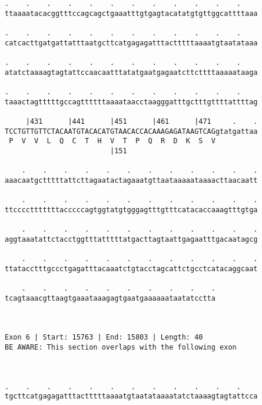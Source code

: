 \documentclass{article}
\begin{document}
\begin{Verbatim}
.    .    .    .    .    .    .    .    .    .    .    .    
ttaaaatacacggtttccagcagctgaaatttgtgagtacatatgtgttggcattttaaa
                                                            
.    .    .    .    .    .    .    .    .    .    .    .    
catcacttgatgattatttaatgcttcatgagagatttactttttaaaatgtaatataaa
                                                            
.    .    .    .    .    .    .    .    .    .    .    .    
atatctaaaagtagtattccaacaatttatatgaatgagaatcttcttttaaaaataaga
                                                            
.    .    .    .    .    .    .    .    .    .    .    .    
taaactagtttttgccagttttttaaaataacctaagggatttgctttgttttattttag
                                                            
     |431      |441      |451      |461      |471     .    .
TCCTGTTGTTCTACAATGTACACATGTAACACCACAAAGAGATAAGTCAGgtatgattaa
 P  V  V  L  Q  C  T  H  V  T  P  Q  R  D  K  S  V          
                         |151                               
  
    .    .    .    .    .    .    .    .    .    .    .    .
aaacaatgctttttattcttagaatactagaaatgttaataaaaataaaacttaacaatt
                                                            
    .    .    .    .    .    .    .    .    .    .    .    .
ttcccctttttttacccccagtggtatgtgggagtttgtttcatacaccaaagtttgtga
                                                            
    .    .    .    .    .    .    .    .    .    .    .    .
aggtaaatattctacctggtttatttttatgacttagtaattgagaatttgacaatagcg
                                                            
    .    .    .    .    .    .    .    .    .    .    .    .
ttatacctttgccctgagatttacaaatctgtacctagcattctgcctcatacaggcaat
                                                            
    .    .    .    .    .    .    .    .    .    .
tcagtaaacgttaagtgaaataaagagtgaatgaaaaaataatatcctta
                                                  
                                                  
 
Exon 6 | Start: 15763 | End: 15803 | Length: 40
BE AWARE: This section overlaps with the following exon



.    .    .    .    .    .    .    .    .    .    .    .    
tgcttcatgagagatttactttttaaaatgtaatataaaatatctaaaagtagtattcca
                                                            

\end{Verbatim}
\end{document}
